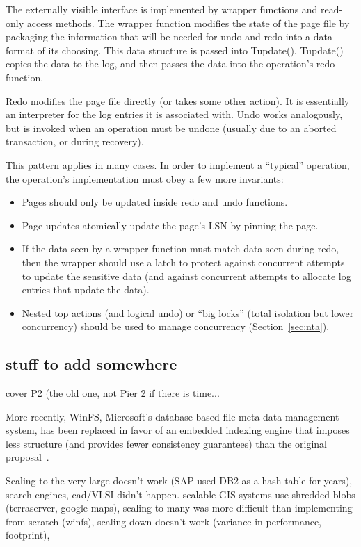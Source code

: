 \documentclass[letterpaper,twocolumn,10pt]{article}
\begin{document}
{The externally visible interface is implemented by wrapper functions
and read-only access methods.  The wrapper function modifies the state
of the page file by packaging the information that will be needed for
undo and redo into a data format of its choosing.  This data structure
is passed into Tupdate().  Tupdate() copies the data to the log, and
then passes the data into the operation's redo function.
 
Redo modifies the page file directly (or takes some other action).  It
is essentially an interpreter for the log entries it is associated
with.  Undo works analogously, but is invoked when an operation must
be undone (usually due to an aborted transaction, or during recovery).

This pattern applies in many cases.  In
order to implement a ``typical'' operation, the operation's
implementation must obey a few more invariants:

\begin{itemize}
\item Pages should only be updated inside redo and undo functions.
\item Page updates atomically update the page's LSN by pinning the page.
\item If the data seen by a wrapper function must match data seen
  during redo, then the wrapper should use a latch to protect against
  concurrent attempts to update the sensitive data (and against
  concurrent attempts to allocate log entries that update the data).
\item Nested top actions (and logical undo) or ``big locks'' (total isolation but lower concurrency) should be used to manage concurrency (Section~\ref{sec:nta}).
\end{itemize}
}

\subsection{stuff to add somewhere}

cover P2 (the old one, not Pier 2 if there is time...

More recently, WinFS, Microsoft's database based
file meta data management system, has been replaced in favor of an
embedded indexing engine that imposes less structure (and provides
fewer consistency guarantees) than the original
proposal~\cite{needtocitesomething}.

Scaling to the very large doesn't work (SAP used DB2 as a hash table
for years), search engines, cad/VLSI didn't happen.  scalable GIS
systems use shredded blobs (terraserver, google maps), scaling to many
was more difficult than implementing from scratch (winfs), scaling
down doesn't work (variance in performance, footprint),
\end{document}
